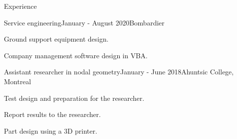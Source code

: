 \documentclass{resume} %
\begin{document}
	
	
	\begin{rSection}{Experience}
		
		\begin{rSubsection}{Service engineering}{January - August 2020}{Bombardier}{}{}
			\item Ground support equipment design.
			\item Company management software design in VBA.
		\end{rSubsection}
		
		\begin{rSubsection}{Assistant researcher in nodal geometry}{January - June 2018}{Ahuntsic College, Montreal}{}
			\item   Test design and preparation for the researcher.
			\item   Report results to the researcher.
			\item   Part design using a 3D printer.
		\end{rSubsection}
		
		
	\end{rSection}
	
	
	\iffalse
	\begin{rSection}{Accomplissements académiques} 
		\begin{rSubsection}{Collège Ahuntsic, Montréal}{2018}{Bourse d'implication scientifique}
			 
		\end{rSubsection}
		\begin{rSubsection}{Polytechnique Montréal}{2018}{Bourse d'excellence à l'admission}
			  
		\end{rSubsection}
		
	\end{rSection}
	\fi
	
\end{document}

